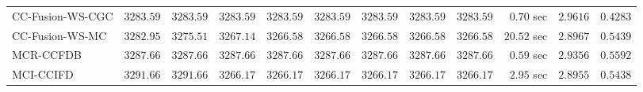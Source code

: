 \begin{table}[H]
\begin{tabular}{lrrrrrrrrrrr}
    CC-Fusion-WS-CGC & $      3283.59$ & $      3283.59$ & $      3283.59$ & $      3283.59$ & $      3283.59$ & $      3283.59$ & $      3283.59$ & $      3283.59$ & $         0.70$ sec    & $       2.9616$  & $       0.4283$ \\ 
     CC-Fusion-WS-MC & $      3282.95$ & $      3275.51$ & $      3267.14$ & $      3266.58$ & $      3266.58$ & $      3266.58$ & $      3266.58$ & $      3266.58$ & $        20.52$ sec    & $       2.8967$  & $       0.5439$ \\ 
\cmidrule{1-1} 
           MCR-CCFDB & $      3287.66$ & $      3287.66$ & $      3287.66$ & $      3287.66$ & $      3287.66$ & $      3287.66$ & $      3287.66$ & $      3287.66$ & $         0.59$ sec    & $       2.9356$  & $       0.5592$ \\ 
\cmidrule{1-1} 
           MCI-CCIFD & $      3291.66$ & $      3291.66$ & $      3266.17$ & $      3266.17$ & $      3266.17$ & $      3266.17$ & $      3266.17$ & $      3266.17$ & $         2.95$ sec    & $       2.8955$  & $       0.5438$ \\ 
\bottomrule
\end{tabular}
\end{table}

